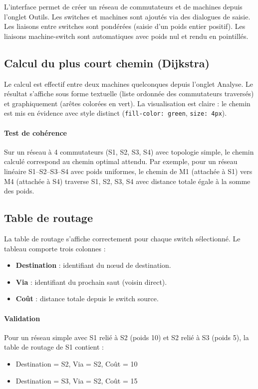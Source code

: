 \documentclass[12pt, a4paper]{article}
\begin{document}
L'interface permet de créer un réseau de commutateurs et de machines depuis l'onglet Outils. Les switches et machines sont ajoutés via des dialogues de saisie. Les liaisons entre switches sont pondérées (saisie d'un poids entier positif). Les liaisons machine-switch sont automatiques avec poids nul et rendu en pointillés.

\subsection{Calcul du plus court chemin (Dijkstra)}

Le calcul est effectif entre deux machines quelconques depuis l'onglet Analyse. Le résultat s'affiche sous forme textuelle (liste ordonnée des commutateurs traversés) et graphiquement (arêtes colorées en vert). La visualisation est claire : le chemin est mis en évidence avec style distinct (\texttt{fill-color: green}, \texttt{size: 4px}).

\paragraph{Test de cohérence}
Sur un réseau à 4 commutateurs (S1, S2, S3, S4) avec topologie simple, le chemin calculé correspond au chemin optimal attendu. Par exemple, pour un réseau linéaire S1--S2--S3--S4 avec poids uniformes, le chemin de M1 (attachée à S1) vers M4 (attachée à S4) traverse S1, S2, S3, S4 avec distance totale égale à la somme des poids.

\subsection{Table de routage}

La table de routage s'affiche correctement pour chaque switch sélectionné. Le tableau comporte trois colonnes :
\begin{itemize}
    \item \textbf{Destination} : identifiant du nœud de destination.
    \item \textbf{Via} : identifiant du prochain saut (voisin direct).
    \item \textbf{Coût} : distance totale depuis le switch source.
\end{itemize}

\paragraph{Validation}
Pour un réseau simple avec S1 relié à S2 (poids 10) et S2 relié à S3 (poids 5), la table de routage de S1 contient :
\begin{itemize}
    \item Destination = S2, Via = S2, Coût = 10
    \item Destination = S3, Via = S2, Coût = 15
\end{itemize}
\end{document}
